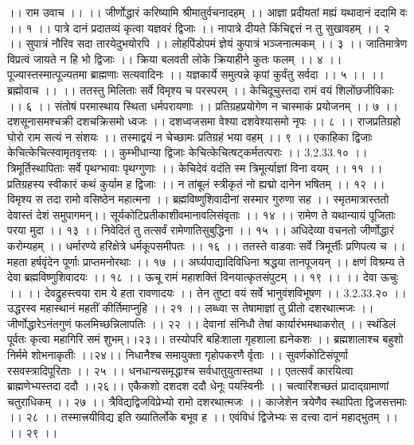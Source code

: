 ।। राम उवाच ।। ।।
जीर्णोद्धारं करिष्यामि श्रीमातुर्वचनादहम् ।।
आज्ञा प्रदीयतां मह्यं यथादानं ददामि वः ।। १ ।।
पात्रे दानं प्रदातव्यं कृत्वा यज्ञवरं द्विजाः ।।
नापात्रे दीयते किंचिद्दत्तं न तु सुखावहम् ।। २ ।।
सुपात्रं नौरिव सदा तारयेदुभयोरपि ।।
लोहपिंडोपमं ज्ञेयं कुपात्रं भञ्जनात्मकम् ।। ३ ।।
जातिमात्रेण विप्रत्वं जायते न हि भो द्विजाः ।।
क्रिया बलवती लोके क्रियाहीने कुतः फलम् ।। ४ ।।
पूज्यास्तस्मात्पूज्यतमा ब्राह्मणाः सत्यवादिनः ।।
यज्ञकार्ये समुत्पन्ने कृपां कुर्वंतु सर्वदा ।। ५ ।।
।। ब्रह्मोवाच ।। ।।
ततस्तु मिलिताः सर्वे विमृश्य च परस्परम् ।।
केचिदूचुस्तदा रामं वयं शिलोंछजीविकाः ।। ६ ।।
संतोषं परमास्थाय स्थिता धर्मपरायणाः ।।
प्रतिग्रहप्रयोगेण न चास्माकं प्रयोजनम् ।। ७ ।।
दशसूनासमश्चक्री दशचक्रिसमो ध्वजः ।।
दशध्वजसमा वेश्या दशवेश्यासमो नृपः ।। ८ ।।
राजप्रतिग्रहो घोरो राम सत्यं न संशयः ।।
तस्माद्वयं न चेच्छामः प्रतिग्रहं भया वहम् ।। ९ ।।
एकाहिका द्विजाः केचित्केचित्स्वामृतवृत्तयः ।।
कुम्भीधान्या द्विजाः केचित्केचित्षट्कर्मतत्पराः ।। 3.2.33.१० ।।
त्रिमूर्तिस्थापिताः सर्वे पृथग्भावाः पृथग्गुणाः ।।
केचिदेवं वदंति स्म त्रिमूर्त्याज्ञां विना वयम् ।। ११ ।।
प्रतिग्रहस्य स्वीकारं कथं कुर्याम ह द्विजाः ।।
न तांबूलं स्त्रीकृतं नो ह्यद्मो दानेन भषितम् ।। १२ ।।
विमृश्य स तदा रामो वसिष्ठेन महात्मना ।।
ब्रह्मविष्णुशिवादीनां सस्मार गुरुणा सह ।।
स्मृतमात्रास्ततो देवास्तं देशं समुपागमन्।।
सूर्यकोटिप्रतीकाशीवमानावलिसंवृताः ।। १४ ।।
रामेण ते यथान्यायं पूजिताः परया मुदा ।। १३ ।।
निवेदितं तु तत्सर्वं रामेणातिसुबुद्धिना ।। १५ ।।
अधिदेव्या वचनतो जीर्णोद्धारं करोम्यहम् ।।
धर्मारण्ये हरिक्षेत्रे धर्मकूपसमीपतः ।। १६ ।।
ततस्ते वाडवाः सर्वे त्रिमूर्त्तीः प्रणिपत्य च ।।
महता हर्षवृंदेन पूर्णाः प्राप्तमनोरथाः ।। १७ ।।
अर्घ्यपाद्यादिविधिना श्रद्धया तानपूजयन् ।।
क्षणं विश्रम्य ते देवा ब्रह्मविष्णुशिवादयः ।। १८ ।।
ऊचू रामं महाशक्तिं विनयात्कृतसंपुटम् ।। १९ ।।
।। देवा ऊचुः ।। ।।
देवद्रुहस्त्वया राम ये हता रावणादयः ।।
तेन तुष्टा वयं सर्वे भानुवंशविभूषण ।। 3.2.33.२० ।।
उद्धरस्व महास्थानं महतीं कीर्तिमाप्नुहि ।। २१ ।।
लब्ध्वा स तेषामाज्ञां तु प्रीतो दशरथात्मजः ।।
जीर्णोद्धारेऽनंतगुणं फलमिच्छन्निलापतिः ।। २२ ।।
देवानां संनिधौ तेषां कार्यारंभमथाकरोत् ।।
स्थंडिलं पूर्वतः कृत्वा महागिरि समं शुभम्।।२३।।
तस्योपरि बहिःशाला गृहशाला ह्यनेकशः ।।
ब्रह्मशालाश्च बहुशो निर्ममे शोभनाकृतीः ।।२४।।
निधानैश्च समायुक्ता गृहोपकरणै र्वृताः ।।
सुवर्णकोटिसंपूर्णा रसवस्त्रादिपूरिताः ।। २५ ।।
धनधान्यसमृद्धाश्च सर्वधातुयुतास्तथा ।।
एतत्सर्वं कारयित्वा ब्राह्मणेभ्यस्तदा ददौ ।।२६।।
एकैकशो दशदश ददौ धेनूः पयस्विनीः ।।
चत्वारिंशच्छतं प्रादाद्ग्रामाणां चतुराधिकम् ।। २७ ।।
त्रैविद्यद्विजविप्रेभ्यो रामो दशरथात्मजः ।।
काजेशेन त्रयेणैव स्थापिता द्विजसत्तमाः ।। २८ ।।
तस्मात्त्रयीविद्य इति ख्यातिर्लोके बभूव ह ।।
एवंविधं द्विजेभ्यः स दत्त्वा दानं महाद्भुतम् ।। ।। २९ ।।
